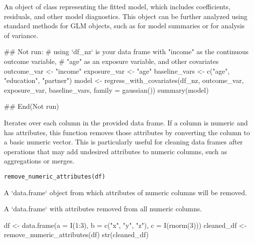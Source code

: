 \documentclass[a4paper]{book}
\begin{document}
%
\begin{Value}
An object of class  representing the fitted model, which includes coefficients, residuals, and other model diagnostics. This object can be further analyzed using standard methods for GLM objects, such as  for model summaries or  for analysis of variance.
\end{Value}
%
\begin{Examples}
\begin{ExampleCode}
## Not run: 
# using `df_nz` is your data frame with "income" as the continuous outcome variable,
# "age" as an exposure variable, and other covariates
outcome_var <- "income"
exposure_var <- "age"
baseline_vars <- c("age", "education", "partner")
model <- regress_with_covariates(df_nz, outcome_var, exposure_var, baseline_vars, family =  gaussian())
summary(model)

## End(Not run)

\end{ExampleCode}
\end{Examples}
%
\begin{Description}
Iterates over each column in the provided data frame. If a column is numeric
and has attributes, this function removes those attributes by converting the column
to a basic numeric vector. This is particularly useful for cleaning data frames
after operations that may add undesired attributes to numeric columns, such as
aggregations or merges.
\end{Description}
%
\begin{Usage}
\begin{verbatim}
remove_numeric_attributes(df)
\end{verbatim}
\end{Usage}
%
\begin{Arguments}
\begin{ldescription}
\item[\code{df}] A `data.frame` object from which attributes of numeric columns will be removed.
\end{ldescription}
\end{Arguments}
%
\begin{Value}
A `data.frame` with attributes removed from all numeric columns.
\end{Value}
%
\begin{Examples}
\begin{ExampleCode}
df <- data.frame(a = I(1:3), b = c("x", "y", "z"), c = I(rnorm(3)))
cleaned_df <- remove_numeric_attributes(df)
str(cleaned_df)

\end{ExampleCode}
\end{Examples}
\end{document}
